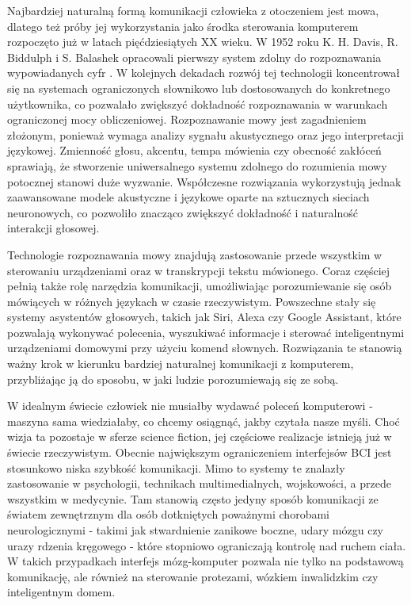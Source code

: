 Najbardziej naturalną formą komunikacji człowieka z otoczeniem jest mowa, dlatego też próby jej wykorzystania jako środka sterowania komputerem rozpoczęto już w latach pięćdziesiątych XX wieku. W 1952 roku K. H. Davis, R. Biddulph i S. Balashek opracowali pierwszy system zdolny do rozpoznawania wypowiadanych cyfr \cite{davis1952}. W kolejnych dekadach rozwój tej technologii koncentrował się na systemach ograniczonych słownikowo lub dostosowanych do konkretnego użytkownika, co pozwalało zwiększyć dokładność rozpoznawania w warunkach ograniczonej mocy obliczeniowej. Rozpoznawanie mowy jest zagadnieniem złożonym, ponieważ wymaga analizy sygnału akustycznego oraz jego interpretacji językowej. Zmienność głosu, akcentu, tempa mówienia czy obecność zakłóceń sprawiają, że stworzenie uniwersalnego systemu zdolnego do rozumienia mowy potocznej stanowi duże wyzwanie. Współczesne rozwiązania wykorzystują jednak zaawansowane modele akustyczne i językowe oparte na sztucznych sieciach neuronowych, co pozwoliło znacząco zwiększyć dokładność i naturalność interakcji głosowej.

Technologie rozpoznawania mowy znajdują zastosowanie przede wszystkim w sterowaniu urządzeniami oraz w transkrypcji tekstu mówionego. Coraz częściej pełnią także rolę narzędzia komunikacji, umożliwiając porozumiewanie się osób mówiących w różnych językach w czasie rzeczywistym. Powszechne stały się systemy asystentów głosowych, takich jak Siri, Alexa czy Google Assistant, które pozwalają wykonywać polecenia, wyszukiwać informacje i sterować inteligentnymi urządzeniami domowymi przy użyciu komend słownych. Rozwiązania te stanowią ważny krok w kierunku bardziej naturalnej komunikacji z komputerem, przybliżając ją do sposobu, w jaki ludzie porozumiewają się ze sobą.

W idealnym świecie człowiek nie musiałby wydawać poleceń komputerowi - maszyna sama wiedziałaby, co chcemy osiągnąć, jakby czytała nasze myśli. Choć wizja ta pozostaje w sferze science fiction, jej częściowe realizacje istnieją już w świecie rzeczywistym. Obecnie największym ograniczeniem interfejsów BCI jest stosunkowo niska szybkość komunikacji. Mimo to systemy te znalazły zastosowanie w psychologii, technikach multimedialnych, wojskowości, a przede wszystkim w medycynie. Tam stanowią często jedyny sposób komunikacji ze światem zewnętrznym dla osób dotkniętych poważnymi chorobami neurologicznymi - takimi jak stwardnienie zanikowe boczne, udary mózgu czy urazy rdzenia kręgowego - które stopniowo ograniczają kontrolę nad ruchem ciała. W takich przypadkach interfejs mózg-komputer pozwala nie tylko na podstawową komunikację, ale również na sterowanie protezami, wózkiem inwalidzkim czy inteligentnym domem.

